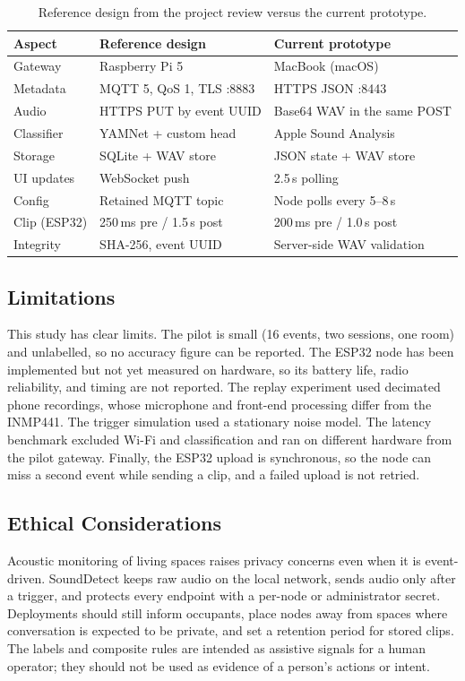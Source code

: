 \documentclass[conference]{IEEEtran}
\newcommand{\ms}{\,ms}
\begin{document}
\begin{table}[!t]
\centering
\caption{Reference design from the project review versus the current prototype.}
\label{tab:evolution}
\renewcommand{\arraystretch}{1.1}
\footnotesize
\begin{tabular}{@{}p{1.55cm}p{3.0cm}p{3.0cm}@{}}
\toprule
\textbf{Aspect} & \textbf{Reference design} & \textbf{Current prototype} \\
\midrule
Gateway & Raspberry Pi 5 & MacBook (macOS) \\
Metadata & MQTT 5, QoS 1, TLS :8883 & HTTPS JSON :8443 \\
Audio & HTTPS PUT by event UUID & Base64 WAV in the same POST \\
Classifier & YAMNet + custom head & Apple Sound Analysis \\
Storage & SQLite + WAV store & JSON state + WAV store \\
UI updates & WebSocket push & 2.5\,s polling \\
Config & Retained MQTT topic & Node polls every 5--8\,s \\
Clip (ESP32) & 250\ms{} pre / 1.5\,s post & 200\ms{} pre / 1.0\,s post \\
Integrity & SHA-256, event UUID & Server-side WAV validation \\
\bottomrule
\end{tabular}
\end{table}

\subsection{Limitations}
\label{sec:limits}
This study has clear limits. The pilot is small (16 events, two sessions, one room) and unlabelled, so no accuracy figure can be reported. The ESP32 node has been implemented but not yet measured on hardware, so its battery life, radio reliability, and timing are not reported. The replay experiment used decimated phone recordings, whose microphone and front-end processing differ from the INMP441. The trigger simulation used a stationary noise model. The latency benchmark excluded Wi-Fi and classification and ran on different hardware from the pilot gateway. Finally, the ESP32 upload is synchronous, so the node can miss a second event while sending a clip, and a failed upload is not retried.

\subsection{Ethical Considerations}
Acoustic monitoring of living spaces raises privacy concerns even when it is event-driven. SoundDetect keeps raw audio on the local network, sends audio only after a trigger, and protects every endpoint with a per-node or administrator secret. Deployments should still inform occupants, place nodes away from spaces where conversation is expected to be private, and set a retention period for stored clips. The labels and composite rules are intended as assistive signals for a human operator; they should not be used as evidence of a person's actions or intent.
\end{document}
